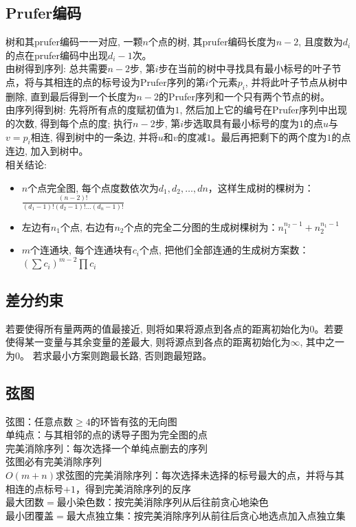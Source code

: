     \subsection*{Prufer编码}
        树和其prufer编码一一对应, 一颗$ n $个点的树, 其prufer编码长度为$ n − 2 $, 且度数为$ d_i $的点在prufer编码中出现$ d_i − 1 $次。
        \\由树得到序列: 总共需要$ n − 2 $步, 第$ i $步在当前的树中寻找具有最小标号的叶子节点，将与其相连的点的标号设为Prufer序列的第$ i $个元素$ p_i $, 并将此叶子节点从树中删除, 直到最后得到一个长度为$ n − 2 $的Prufer序列和一个只有两个节点的树。
        \\由序列得到树: 先将所有点的度赋初值为$ 1 $, 然后加上它的编号在Prufer序列中出现的次数, 得到每个点的度; 执行$ n − 2 $步, 第$ i $步选取具有最小标号的度为$ 1 $的点$ u $与$ v = p_i$相连, 得到树中的一条边, 并将$ u $和$ v $的度减$ 1 $。最后再把剩下的两个度为$ 1 $的点连边, 加入到树中。
        \\相关结论:
        \begin{itemize}[wide=0pt]
            \item $ n $个点完全图, 每个点度数依次为$ d_1, d_2 , \dots, dn $，这样生成树的棵树为：$ \frac{(n - 2) !}{(d_1 - 1)! (d_2 - 1)! \dots (d_n - 1)!} $
            \item 左边有$ n_1 $个点, 右边有$ n_2 $个点的完全二分图的生成树棵树为：$ n_1^{n_2 - 1} + n_2^{n_1 - 1} $
            \item $ m $个连通块, 每个连通块有$ c_i $个点, 把他们全部连通的生成树方案数：$ (\sum c_i)^{m - 2} \prod c_i $
        \end{itemize}
    \subsection*{差分约束}
        若要使得所有量两两的值最接近, 则将如果将源点到各点的距离初始化为$ 0 $。若要使得某一变量与其余变量的差最大, 则将源点到各点的距离初始化为$ \infty $, 其中之一为$ 0 $。 若求最小方案则跑最长路, 否则跑最短路。
    \subsection*{弦图}
        弦图：任意点数$ \geq 4 $的环皆有弦的无向图
        \\单纯点：与其相邻的点的诱导子图为完全图的点
        \\完美消除序列：每次选择一个单纯点删去的序列
        \\弦图必有完美消除序列
        \\$ O(m + n) $求弦图的完美消除序列：每次选择未选择的标号最大的点，并将与其相连的点标号$ + 1 $，得到完美消除序列的反序
        \\最大团数$ = $最小染色数：按完美消除序列从后往前贪心地染色
        \\最小团覆盖$ = $最大点独立集：按完美消除序列从前往后贪心地选点加入点独立集
